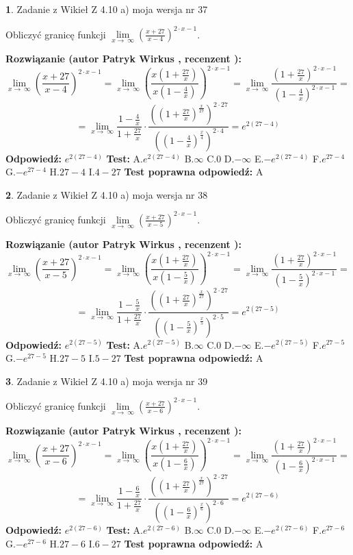 \documentclass[12pt, a4paper]{article}
\theoremstyle{definition} %
\newtheorem{zad}{}
\newcommand{\zadStart}[1]{\begin{zad}#1\newline}
\newcommand{\zadStop}{\end{zad}}
\newcommand{\rozwStart}[2]{\noindent \textbf{Rozwiązanie (autor #1 , recenzent #2): }\newline}
\newcommand{\rozwStop}{\newline}
\newcommand{\odpStart}{\noindent \textbf{Odpowiedź:}\newline}
\newcommand{\odpStop}{\newline}
\newcommand{\testStart}{\noindent \textbf{Test:}\newline}
\newcommand{\testStop}{\newline}
\newcommand{\kluczStart}{\noindent \textbf{Test poprawna odpowiedź:}\newline}
\newcommand{\kluczStop}{\newline}
\begin{document}
\zadStart{Zadanie z Wikieł Z 4.10 a) moja wersja nr 37}


Obliczyć granicę funkcji  $\lim\limits_{x\to\ \infty}(\frac{x+27}{x-4})^{2\cdot x-1}$.
\zadStop
\rozwStart{Patryk Wirkus}{}
$$\lim\limits_{x\to\ \infty}(\frac{x+27}{x-4})^{2\cdot x-1} = \lim\limits_{x\to\ \infty}(\frac{x(1+\frac{27}{x})}{x(1-\frac{4}{x})})^{2\cdot x-1}=\lim\limits_{x\to\ \infty}\frac{(1+\frac{27}{x})^{2\cdot x-1}}{(1-\frac{4}{x})^{2\cdot x-1}}=$$
$$=\lim\limits_{x\to\ \infty}\frac{1-\frac{4}{x}}{1+\frac{27}{x}}\cdot\frac{((1+\frac{27}{x})^{\frac{x}{27}})^{2\cdot27}}{((1-\frac{4}{x})^{\frac{x}{4}})^{2\cdot4}}=e^{2(27-4)}$$
\rozwStop
\odpStart
$e^{2(27-4)}$
\odpStop
\testStart
A.$e^{2(27-4)}$ B.$\infty$ C.$0$ D.$-\infty$ E.$-e^{2(27-4)}$
F.$e^{27-4}$ G.$-e^{27-4}$
H.$27-4$
I.$4-27$
\testStop
\kluczStart
A
\kluczStop



\zadStart{Zadanie z Wikieł Z 4.10 a) moja wersja nr 38}


Obliczyć granicę funkcji  $\lim\limits_{x\to\ \infty}(\frac{x+27}{x-5})^{2\cdot x-1}$.
\zadStop
\rozwStart{Patryk Wirkus}{}
$$\lim\limits_{x\to\ \infty}(\frac{x+27}{x-5})^{2\cdot x-1} = \lim\limits_{x\to\ \infty}(\frac{x(1+\frac{27}{x})}{x(1-\frac{5}{x})})^{2\cdot x-1}=\lim\limits_{x\to\ \infty}\frac{(1+\frac{27}{x})^{2\cdot x-1}}{(1-\frac{5}{x})^{2\cdot x-1}}=$$
$$=\lim\limits_{x\to\ \infty}\frac{1-\frac{5}{x}}{1+\frac{27}{x}}\cdot\frac{((1+\frac{27}{x})^{\frac{x}{27}})^{2\cdot27}}{((1-\frac{5}{x})^{\frac{x}{5}})^{2\cdot5}}=e^{2(27-5)}$$
\rozwStop
\odpStart
$e^{2(27-5)}$
\odpStop
\testStart
A.$e^{2(27-5)}$ B.$\infty$ C.$0$ D.$-\infty$ E.$-e^{2(27-5)}$
F.$e^{27-5}$ G.$-e^{27-5}$
H.$27-5$
I.$5-27$
\testStop
\kluczStart
A
\kluczStop



\zadStart{Zadanie z Wikieł Z 4.10 a) moja wersja nr 39}


Obliczyć granicę funkcji  $\lim\limits_{x\to\ \infty}(\frac{x+27}{x-6})^{2\cdot x-1}$.
\zadStop
\rozwStart{Patryk Wirkus}{}
$$\lim\limits_{x\to\ \infty}(\frac{x+27}{x-6})^{2\cdot x-1} = \lim\limits_{x\to\ \infty}(\frac{x(1+\frac{27}{x})}{x(1-\frac{6}{x})})^{2\cdot x-1}=\lim\limits_{x\to\ \infty}\frac{(1+\frac{27}{x})^{2\cdot x-1}}{(1-\frac{6}{x})^{2\cdot x-1}}=$$
$$=\lim\limits_{x\to\ \infty}\frac{1-\frac{6}{x}}{1+\frac{27}{x}}\cdot\frac{((1+\frac{27}{x})^{\frac{x}{27}})^{2\cdot27}}{((1-\frac{6}{x})^{\frac{x}{6}})^{2\cdot6}}=e^{2(27-6)}$$
\rozwStop
\odpStart
$e^{2(27-6)}$
\odpStop
\testStart
A.$e^{2(27-6)}$ B.$\infty$ C.$0$ D.$-\infty$ E.$-e^{2(27-6)}$
F.$e^{27-6}$ G.$-e^{27-6}$
H.$27-6$
I.$6-27$
\testStop
\kluczStart
A
\kluczStop
\end{document}
